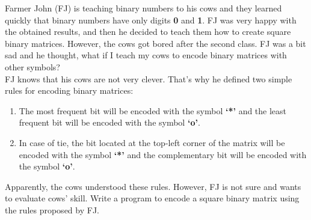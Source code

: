 %

Farmer John (FJ) is teaching binary numbers to his cows and they learned quickly that binary numbers have only digits \textbf{0} and \textbf{1}. FJ was very happy with the obtained results, and then he decided to teach them how to create square binary matrices. However, the cows got bored after the second class. FJ was a bit sad and he thought, what if I teach my cows to encode binary matrices with other symbols?\\

FJ knows that his cows are not very clever. That's why he defined two simple rules for encoding binary matrices:\\

\begin{enumerate}
	\item The most frequent bit will be encoded with the symbol \textbf{`*'} and the least frequent bit will be encoded with the symbol \textbf{`o'}.
	\item In case of tie, the bit located at the top-left corner of the matrix will be encoded with the symbol \textbf{`*'} and the complementary bit will be encoded with the symbol \textbf{`o'}.
\end{enumerate}

Apparently, the cows understood these rules. However, FJ is not sure and wants to evaluate cows' skill. Write a program to encode a square binary matrix using the rules proposed by FJ.

%
%



%
%




\sampleio
